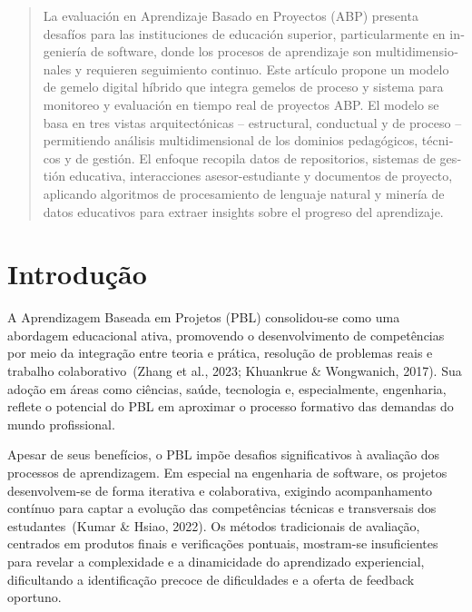 \documentclass[english, spanish, brazilian]{modelo_dt}
\begin{document}
\begin{otherlanguage}{spanish}
\renewcommand{\abstractname}{Resumen}
\begin{abstract}
La evaluación en Aprendizaje Basado en Proyectos (ABP) presenta desafíos para las instituciones de educación superior, particularmente en ingeniería de software, donde los procesos de aprendizaje son multidimensionales y requieren seguimiento continuo\@. Este artículo propone un modelo de gemelo digital híbrido que integra gemelos de proceso y sistema para monitoreo y evaluación en tiempo real de proyectos ABP\@. El modelo se basa en tres vistas arquitectónicas -- estructural, conductual y de proceso -- permitiendo análisis multidimensional de los dominios pedagógicos, técnicos y de gestión\@. El enfoque recopila datos de repositorios, sistemas de gestión educativa, interacciones asesor-estudiante y documentos de proyecto, aplicando algoritmos de procesamiento de lenguaje natural y minería de datos educativos para extraer insights sobre el progreso del aprendizaje\@.
\end{abstract}
\end{otherlanguage}

\pagebreak

\section{Introdução}

A Aprendizagem Baseada em Projetos (PBL) consolidou-se como uma abordagem educacional ativa, promovendo o desenvolvimento de competências por meio da integração entre teoria e prática, resolução de problemas reais e trabalho colaborativo~(Zhang et al., 2023; Khuankrue & Wongwanich, 2017). Sua adoção em áreas como ciências, saúde, tecnologia e, especialmente, engenharia, reflete o potencial do PBL em aproximar o processo formativo das demandas do mundo profissional.

Apesar de seus benefícios, o PBL impõe desafios significativos à avaliação dos processos de aprendizagem. Em especial na engenharia de software, os projetos desenvolvem-se de forma iterativa e colaborativa, exigindo acompanhamento contínuo para captar a evolução das competências técnicas e transversais dos estudantes~(Kumar & Hsiao, 2022). Os métodos tradicionais de avaliação, centrados em produtos finais e verificações pontuais, mostram-se insuficientes para revelar a complexidade e a dinamicidade do aprendizado experiencial, dificultando a identificação precoce de dificuldades e a oferta de feedback oportuno.
\end{document}
